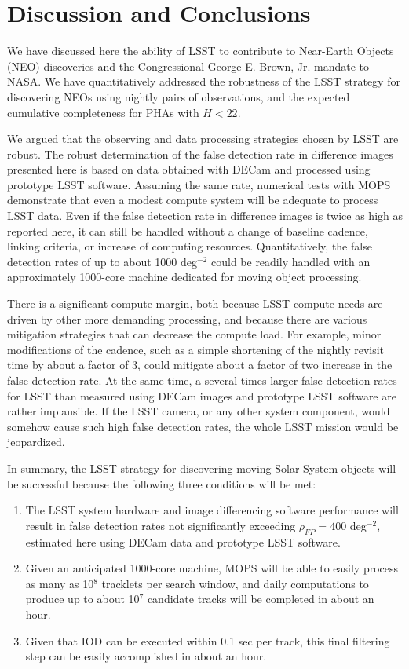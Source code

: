 

\section{Discussion and Conclusions}

We have discussed here the ability of LSST to contribute to Near-Earth Objects (NEO) discoveries and
the Congressional George E. Brown, Jr. mandate to NASA. We have quantitatively addressed
the robustness of the LSST strategy for discovering NEOs using nightly pairs of observations, and
the expected cumulative completeness for PHAs with $H<22$.

We argued that the observing and data processing strategies chosen by LSST are robust. The
robust determination of the false detection rate in difference images presented here is based
on data obtained with DECam and processed using prototype LSST software. Assuming the same rate,
numerical tests with MOPS demonstrate that even a modest compute system will be adequate to
process LSST data. Even if the false detection rate in difference images is twice as high as
reported here, it can still be handled without a change of baseline cadence, linking criteria, or
increase of computing resources. Quantitatively, the false detection rates of up to about
1000 deg$^{-2}$ could be readily handled with an approximately 1000-core machine dedicated for
moving object processing.

There is a significant compute margin, both because LSST compute needs are driven by other more
demanding processing, and because there are various mitigation strategies that can decrease the
compute load. For example, minor modifications of the cadence, such as a simple shortening
of the nightly revisit time by about a factor of 3, could mitigate about a factor of two increase in
the false detection rate. At the same time, a several times larger false detection rates for LSST
than measured using DECam images and prototype LSST software are rather implausible. If the
LSST camera, or any other system component, would somehow cause such high false detection rates,
the whole LSST mission would be jeopardized.

In summary, the LSST strategy for discovering moving Solar System objects will be successful
because the following three conditions will be met:
\begin{enumerate}
\item The LSST system hardware and image differencing software performance will result in false detection
          rates not significantly exceeding $\rho_{FP} =  400$ deg$^{-2}$, estimated here using DECam data
          and prototype LSST software.
\item Given an anticipated 1000-core machine, MOPS will be able to easily process as many as
         10$^8$ tracklets per search window, and daily computations to produce up to about 10$^7$
         candidate tracks will be completed in about an hour.
\item Given that IOD can be executed within 0.1 sec per track, this final filtering step can
         be easily accomplished in about an hour.
\end{enumerate}


